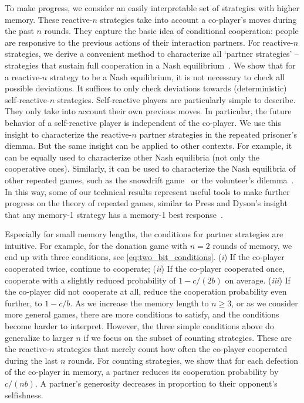 \documentclass[9pt,twocolumn,twoside]{pnas-new}
\begin{document}
To make progress, we consider an easily interpretable set of strategies with higher memory. 
These reactive-$n$ strategies take into account a co-player's moves during the past $n$ rounds. 
They capture the basic idea of conditional cooperation: people are responsive to the previous actions of their interaction partners. 
For reactive-$n$ strategies, we derive a convenient method to characterize all `partner strategies' -- strategies that sustain full cooperation in a Nash equilibrium~\citep{akin:EGADS:2016,Hilbe:GEB:2015}. 
We show that for a reactive-$n$ strategy to be a Nash equilibrium, it is not necessary to check all possible deviations. 
It suffices to only check deviations towards (deterministic) self-reactive-$n$ strategies. 
Self-reactive players are particularly simple to describe. 
They only take into account their own previous moves. 
In particular, the future behavior of a self-reactive player is independent of the co-player. 
We use this insight to characterize the reactive-$n$ partner strategies in the repeated prisoner's diemma.
But the same insight can be applied to other contexts. 
For example, it can be equally used to characterize other Nash equilibria (not only the cooperative ones). 
Similarly, it can be used to characterize the Nash equilibria of other repeated games, such as the snowdrift game~\citep{doebeli:EL:2005} or the volunteer's dilemma~\citep{diekmann:jcr:1985}.  
In this way, some of our technical results represent useful tools to make further progress on the theory of repeated games, similar to Press and Dyson's insight that any memory-1 strategy has a memory-1 best response~\citep{press:PNAS:2012}. 

Especially for small memory lengths, the conditions for partner strategies are intuitive. 
For example, for the donation game with $n\!=\!2$ rounds of memory, we end up with three conditions, see \eqref{eq:two_bit_conditions}.
({\it i}) If the co-player cooperated twice, continue to cooperate; 
({\it ii}) If the co-player cooperated once, cooperate with a slightly reduced probability of $1\!-\!c/(2b)$ on average. 
({\it iii}) If the co-player did not cooperate at all, reduce the cooperation probability even further, to $1\!-\!c/b$. 
As we increase the memory length to $n\!\ge\!3$, or as we consider more general games, there are more conditions to satisfy, and the conditions become harder to interpret. 
However, the three simple conditions above do generalize to larger $n$ if we focus on the subset of counting strategies. 
These are the reactive-$n$ strategies that merely count how often the co-player cooperated during the last $n$ rounds. 
For counting strategies, we show that for each defection of the co-player in memory, a partner reduces its cooperation probability by $c/(nb)$. 
A partner's generosity decreases in proportion to their opponent's selfishness. 
\end{document}
